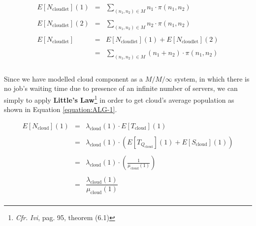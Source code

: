 \documentclass[10pt,a4paper]{article}
\begin{document}
\begin{equation}
\label{eq:cloudletAveragePopulation}
\begin{array} {rcl} 
E[N_{\text{cloudlet}}](1) & = & \displaystyle \sum_{ (n_1, n_2) \in M} n_1 \cdot \pi(n_1,n_2) \\\\

E[N_{\text{cloudlet}}](2) & = & \displaystyle \sum_{ (n_1, n_2) \in M} n_2 \cdot \pi(n_1,n_2) \\\\

E[N_{\text{cloudlet}}] & = & E[N_{\text{cloudlet}}](1) + E[N_{\text{cloudlet}}](2) \\\\

& = & \displaystyle \sum_{ (n_1, n_2) \in M} (n_1 + n_2) \cdot \pi(n_1,n_2) \\\\

\end{array}
\end{equation}

Since we have modelled cloud component as a $M/M/\infty$ system, in which there is no job's waiting time due to presence of an infinite number of servers, we can simply to apply \textbf{Little’s Law}\footnote{\textit{Cfr.} \textit{Ivi}, pag. 95, theorem (6.1)} in order to get cloud's average population as shown in Equation \ref{equation:ALG-1}.

\begin{equation}
\label{eq:cloudAveragePopulation1}
\begin{array} {rcl} 
E[N_{\text{cloud}}](1) & = & \lambda_{\text{cloud}}(1) \cdot E[T_{\text{cloud}}](1)  \\\\

& = & \lambda_{\text{cloud}}(1) \cdot (E[T_{Q_{\text{cloud}}}](1) + E[S_{\text{cloud}}](1))  \\\\

& = & \lambda_{\text{cloud}}(1) \cdot (\frac{1}{\mu_{\text{cloud}}(1)}) \\\\

& = & \dfrac{\lambda_{\text{cloud}}(1)}{\mu_{\text{cloud}}(1)} \\

\end{array}
\end{equation}
\end{document}

